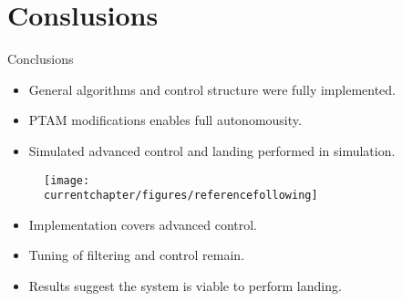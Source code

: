 \section{Conslusions}
    \begin{frame}{Conclusions}
        \begin{itemize}
            \item General algorithms and control structure were fully implemented.
            \item PTAM modifications enables full autonomousity.
            \item Simulated advanced control and landing performed in simulation.
        \end{itemize}
        \vspace{-0.5cm}
        \begin{figure}[h]
            \texttt{[image: \\currentchapter/figures/referencefollowing]}
        \end{figure}
        \vspace{-0.5cm}
        \begin{itemize}
            \item Implementation covers advanced control.
            \item Tuning of filtering and control remain.
            \item Results suggest the system is viable to perform landing.
        \end{itemize}
    \end{frame}
